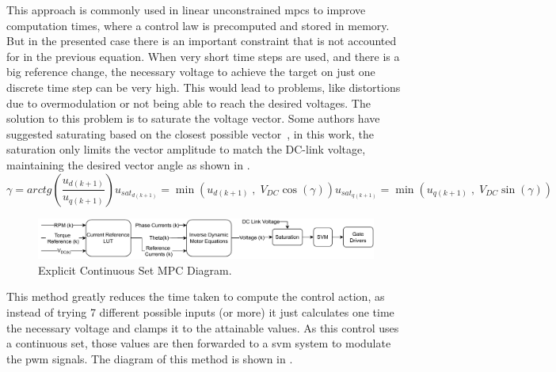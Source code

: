 This approach is commonly used in linear unconstrained \glspl{mpc} to improve computation times, where a control law is precomputed and stored in memory. But in the presented case there is an important constraint that is not accounted for in the previous equation. When very short time steps are used, and there is a big reference change, the necessary voltage to achieve the target on just one discrete time step can be very high. This would lead to problems, like distortions due to overmodulation or not being able to reach the desired voltages. The solution to this problem is to saturate the voltage vector. Some authors have suggested saturating based on the closest possible vector~\cite{Fernando:fast_predictive:2013}, in this work, the saturation only limits the vector amplitude to match the DC-link voltage, maintaining the desired vector angle as shown in .
\begin{subequations}
	\begin{equation}
			\gamma = arctg\left(\frac{u_{d(k+1)}}{u_{q(k+1)}}\right)
	\end{equation}
	\begin{equation}
		u_{sat_{d(k+1)}} = \min\left(u_{d(k+1)}\;,\; V_{DC}\cos(\gamma)\right)
	\end{equation}
	\begin{equation}
		u_{sat_{q(k+1)}} = \min\left(u_{q(k+1)}\;,\; V_{DC}\sin(\gamma)\right)
	\end{equation}
	\label{eq:Vdq_saturation}
\end{subequations}

\begin{figure}[!htb]
	\centering
	\includegraphics[width=1\textwidth]{Figures/Explicit_CSMPC.pdf}
	\caption[Explicit Continuous Set MPC Diagram.]{Explicit Continuous Set MPC Diagram.}
	\label{fig:explicit_csmpc_diagram}%
\end{figure}

This method greatly reduces the time taken to compute the control action, as instead of trying 7 different possible inputs (or more) it just calculates one time the necessary voltage and clamps it to the attainable values. As this control uses a continuous set, those values are then forwarded to a \gls{svm} system to modulate the \gls{pwm} signals. The diagram of this method is shown in .


